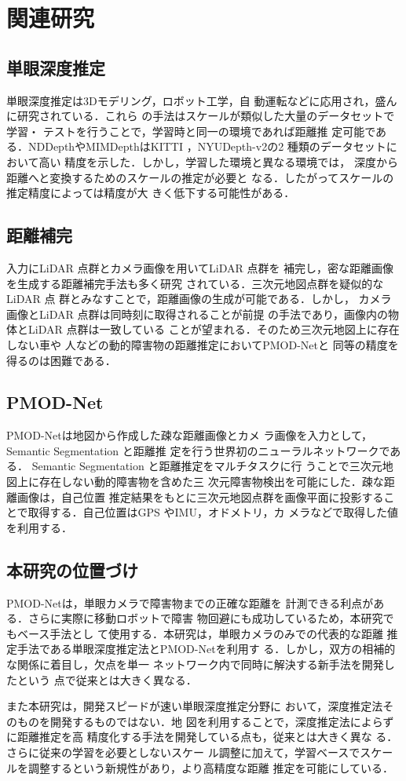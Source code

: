 \section{関連研究}

\subsection{単眼深度推定}
単眼深度推定は3Dモデリング\cite{4}，ロボット工学\cite{5}，自
動運転\cite{6}などに応用され，盛んに研究されている．これら
の手法はスケールが類似した大量のデータセットで学習・
テストを行うことで，学習時と同一の環境であれば距離推
定可能である．NDDepth\cite{1}やMIMDepth\cite{2}はKITTI\cite{7}
，NYUDepth-v2\cite{8}の2 種類のデータセットにおいて高い
精度を示した．しかし，学習した環境と異なる環境では，
深度から距離へと変換するためのスケールの推定が必要と
なる．したがってスケールの推定精度によっては精度が大
きく低下する可能性がある．
\subsection{距離補完}
入力にLiDAR 点群とカメラ画像を用いてLiDAR 点群を
補完し，密な距離画像を生成する距離補完手法も多く研究
されている\cite{9}\cite{10}．三次元地図点群を疑似的なLiDAR 点
群とみなすことで，距離画像の生成が可能である．しかし，
カメラ画像とLiDAR 点群は同時刻に取得されることが前提
の手法であり，画像内の物体とLiDAR 点群は一致している
ことが望まれる．そのため三次元地図上に存在しない車や
人などの動的障害物の距離推定においてPMOD-Net\cite{3}と
同等の精度を得るのは困難である．
\subsection{PMOD-Net}
PMOD-Net\cite{3}は地図から作成した疎な距離画像とカメ
ラ画像を入力として，Semantic Segmentation と距離推
定を行う世界初のニューラルネットワークである．
Semantic Segmentation と距離推定をマルチタスクに行
うことで三次元地図上に存在しない動的障害物を含めた三
次元障害物検出を可能にした．疎な距離画像は，自己位置
推定結果をもとに三次元地図点群を画像平面に投影するこ
とで取得する．自己位置はGPS やIMU，オドメトリ，カ
メラなどで取得した値を利用する．
\subsection{本研究の位置づけ}
PMOD-Netは，単眼カメラで障害物までの正確な距離を
計測できる利点がある．さらに実際に移動ロボットで障害
物回避にも成功しているため，本研究でもベース手法とし
て使用する．本研究は，単眼カメラのみでの代表的な距離
推定手法である単眼深度推定法とPMOD-Net\cite{3}を利用す
る．しかし，双方の相補的な関係に着目し，欠点を単一
ネットワーク内で同時に解決する新手法を開発したという
点で従来とは大きく異なる．

また本研究は，開発スピードが速い単眼深度推定分野に
おいて，深度推定法そのものを開発するものではない．地
図を利用することで，深度推定法によらずに距離推定を高
精度化する手法を開発している点も，従来とは大きく異な
る．さらに従来の学習を必要としないスケー
ル調整に加えて，学習ベースでスケールを調整するという新規性があり，より高精度な距離
推定を可能にしている．



